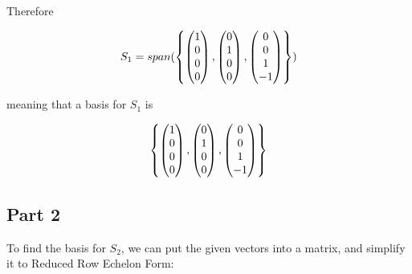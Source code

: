 \documentclass[12pt]{article} %
\begin{document}
\begin{homeworkProblem}
    Therefore

    $$
        S_1 = span(\left\{
            \begin{pmatrix} 1 \\ 0 \\ 0 \\ 0  \end{pmatrix},
            \begin{pmatrix} 0 \\ 1 \\ 0 \\ 0  \end{pmatrix},
            \begin{pmatrix} 0 \\ 0 \\ 1 \\ -1 \end{pmatrix}
        \right\})
    $$

    meaning that a basis for $S_1$ is

    $$
        \left\{
            \begin{pmatrix} 1 \\ 0 \\ 0 \\ 0  \end{pmatrix},
            \begin{pmatrix} 0 \\ 1 \\ 0 \\ 0  \end{pmatrix},
            \begin{pmatrix} 0 \\ 0 \\ 1 \\ -1 \end{pmatrix}
        \right\}
    $$

    \pagebreak

    \subsection*{Part 2}

    To find the basis for $S_2$, we can put the given vectors into a matrix, and simplify it to Reduced Row Echelon Form:



\end{homeworkProblem}
\end{document}
